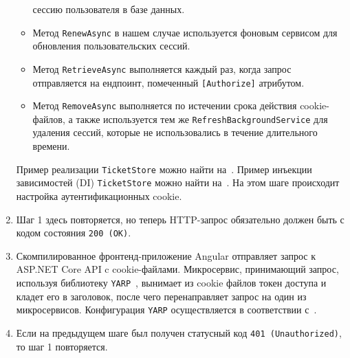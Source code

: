 \begin{enumerate}
\begin{itemize}
        сессию пользователя в базе данных.
        \item Метод \texttt{RenewAsync} в нашем случае используется фоновым сервисом для обновления пользовательских сессий.
        \item Метод \texttt{RetrieveAsync} выполняется каждый раз, когда запрос отправляется на ендпоинт,
        помеченный \texttt{[Authorize]} атрибутом.
        \item Метод \texttt{RemoveAsync} выполняется по истечении срока действия cookie-файлов, а также используется
        тем же \texttt{RefreshBackgroundService} для удаления сессий, которые не использовались в течение длительного времени.
    \end{itemize}
    Пример реализации \texttt{TicketStore} можно найти на~\cite{ticketStore_2023}.
    Пример инъекции зависимостей (DI) \texttt{TicketStore} можно найти на~\cite{ticketStoreDI_2023}.
    На этом шаге происходит настройка аутентификационных cookie.
    \item Шаг 1 здесь повторяется, но теперь HTTP-запрос обязательно должен быть с кодом состояния \texttt{200 (OK)}.
    \item Скомпилированное фронтенд-приложение Angular отправляет запрос к ASP.NET Core API c cookie-файлами.
    Микросервис, принимающий запрос, используя библиотеку \texttt{YARP}~\cite{microsoftYarp2021}, вынимает из
    cookie файлов токен доступа и кладет его в заголовок, после чего перенаправляет запрос на один из микросервисов.
    Конфигурация \texttt{YARP} осуществляется в соответствии с~\cite{yarpDI_2023,yarpSectionAppSettings_2023}.
    \item Если на предыдущем шаге был получен статусный код \texttt{401 (Unauthorized)}, то шаг 1 повторяется.
\end{enumerate}